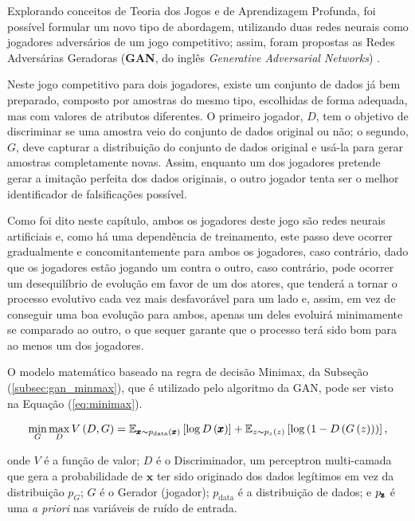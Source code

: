 Explorando conceitos de Teoria dos Jogos e de Aprendizagem Profunda, foi possível formular um novo tipo de abordagem, utilizando duas redes neurais como jogadores adversários de um jogo competitivo; assim, foram propostas as Redes Adversárias Geradoras (\textbf{GAN}, do inglês \textit{Generative Adversarial Networks}) \citep{NIPS2014_5423}.

Neste jogo competitivo para dois jogadores, existe um conjunto de dados já bem preparado, composto por amostras do mesmo tipo, escolhidas de forma adequada, mas com valores de atributos diferentes. O primeiro jogador, $D$, tem o objetivo de discriminar se uma amostra veio do conjunto de dados original ou não; o segundo, $G$, deve capturar a distribuição do conjunto de dados original e usá-la para gerar amostras completamente novas. Assim, enquanto um dos jogadores pretende gerar a imitação perfeita dos dados originais, o outro jogador tenta ser o melhor identificador de falsificações possível.

Como foi dito neste capítulo, ambos os jogadores deste jogo são redes neurais artificiais e, como há uma dependência de treinamento, este passo deve ocorrer gradualmente e concomitantemente para ambos os jogadores, caso contrário, dado que os jogadores estão jogando um contra o outro, caso contrário, pode ocorrer um desequilíbrio de evolução em favor de um dos atores, que tenderá a tornar o processo evolutivo cada vez mais desfavorável para um lado e, assim, em vez de conseguir uma boa evolução para ambos, apenas um deles evoluirá minimamente se comparado ao outro, o que sequer garante que o processo terá sido bom para ao menos um dos jogadores.

O modelo matemático baseado na regra de decisão Minimax, da Subseção (\ref{subsec:gan_minmax}), que é utilizado pelo algoritmo da GAN, pode ser visto na Equação (\ref{eq:minimax}).

\begin{equation}
    \min_{G} \max_{D} V\left(D, G\right) = \mathbb{E}_{\pmb{x}\thicksim p_{\text{data}}\left(\pmb{x}\right)}\left[\log D\left(\pmb{x}\right)\right] + \mathbb{E}_{z\thicksim p_{z}\left(z\right)}\left[\log \left(1 - D\left(G\left(z\right)\right)\right)\right],
    \label{eq:minimax}
\end{equation}

onde $V$ é a função de valor; $D$ é o Discriminador, um perceptron multi-camada que gera a probabilidade de $\pmb{x}$ ter sido originado dos dados legítimos em vez da distribuição $p_{G}$; $G$ é o Gerador (jogador); $p_{\text{data}}$ é a distribuição de dados; e $p_{\text{\pmb{z}}}$ é uma \textit{a priori} nas variáveis de ruído de entrada.


